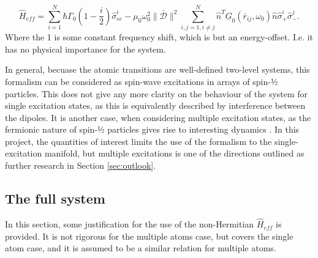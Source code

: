 \documentclass{article}
\begin{document}
\begin{equation}
    \hat{H}_{eff} = \sum_{i=1}^N \hbar \Gamma_0 \left( 1 - \frac{i}{2} \right) \hat{\sigma}_{ee}^i -\mu_0 \omega_0^2 \|\bar{\mathscr{D}}\|^2 \sum_{i,j = 1, i \neq j}^N \hat{n}^T \underline{G}_0(\bar{r}_{ij}, \omega_0) \hat{n} \hat{\sigma}_+^i \hat{\sigma}_-^j.
\end{equation}
Where the 1 is some constant frequency shift, which is but an energy-offset. I.e. it has no physical importance for the system. 

In general, becuase the atomic transitions are well-defined two-level systems, this formalism can be considered as spin-wave excitations in arrays of spin-½ particles. This does not give any more clarity on the behaviour of the system for single excitation states, as this is equivalently described by interference between the dipoles. It is another case, when considering multiple excitation states, as the fermionic nature of spin-½ particles gives rise to interesting dynamics \cite[Section III.C]{Asenjo}. In this project, the quantities of interest limits the use of the formalism to the single-excitation manifold, but multiple excitations is one of the directions outlined as further research in Section \ref{sec:outlook}. 

\subsection{The full system}\label{sec:full_system}
In this section, some justification for the use of the non-Hermitian $\hat{H}_{eff}$ is provided. It is not rigorous for the multiple atoms case, but covers the single atom case, and it is assumed to be a similar relation for multiple atoms. 
\end{document}
